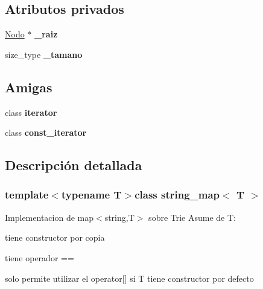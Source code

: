 \subsection*{Atributos privados}
\begin{DoxyCompactItemize}
\item 
\hypertarget{classstring__map_a6ae83923332133a3d78a7c2405f3ac04}{\hyperlink{structstring__map_1_1Nodo}{Nodo} $\ast$ {\bfseries \-\_\-raiz}}\label{classstring__map_a6ae83923332133a3d78a7c2405f3ac04}

\item 
\hypertarget{classstring__map_aa883c09300422c5cfb8ab4d70386d3de}{size\-\_\-type {\bfseries \-\_\-tamano}}\label{classstring__map_aa883c09300422c5cfb8ab4d70386d3de}

\end{DoxyCompactItemize}
\subsection*{Amigas}
\begin{DoxyCompactItemize}
\item 
\hypertarget{classstring__map_a67171474c4da6cc8efe0c7fafefd2b2d}{class {\bfseries iterator}}\label{classstring__map_a67171474c4da6cc8efe0c7fafefd2b2d}

\item 
\hypertarget{classstring__map_ac220ce1c155db1ac44146c12d178056f}{class {\bfseries const\-\_\-iterator}}\label{classstring__map_ac220ce1c155db1ac44146c12d178056f}

\end{DoxyCompactItemize}


\subsection{Descripción detallada}
\subsubsection*{template$<$typename T$>$class string\-\_\-map$<$ T $>$}

Implementacion de map$<$string,\-T$>$ sobre Trie Asume de T\-:
\begin{DoxyItemize}
\item tiene constructor por copia
\item tiene operador ==
\item solo permite utilizar el operator\mbox{[}\mbox{]} si T tiene constructor por defecto 
\end{DoxyItemize}

